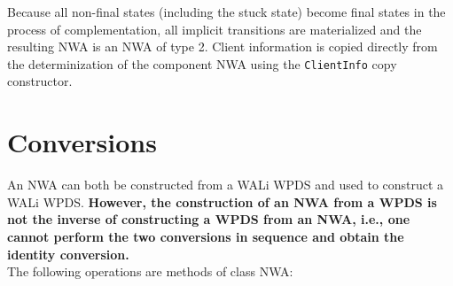 \documentclass{llncs}
\begin{document}
Because all non-final states (including the stuck state) become final states in the process of complementation, all implicit transitions are materialized and the resulting NWA is an NWA of type 2.  Client information is copied directly from the determinization of the component NWA using the \texttt{ClientInfo} copy constructor.

\section{Conversions}
\label{Se:Conversions}


An NWA can both be constructed from a WALi WPDS and used to construct a WALi WPDS.  \textbf{However, the construction of an NWA from a WPDS is not the inverse of constructing a WPDS from an NWA, i.e., one cannot perform the two conversions in sequence and obtain the identity conversion.} \\

\noindent The following operations are methods of class NWA:
\end{document}
